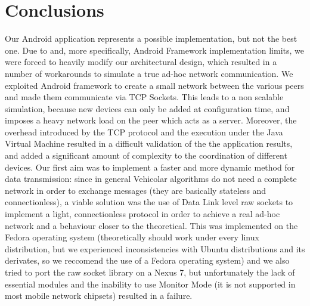 \newpage
\section{Conclusions}
	Our Android application represents a possible implementation, but not the best one. Due to \direct and, more specifically, Android \direct Framework implementation limits, we were forced to heavily modify our architectural design, which resulted in a number of workarounds to simulate a true ad-hoc network communication. We exploited Android \direct framework to create a small network between the various peers and made them communicate via TCP Sockets. This leads to a non scalable simulation, because new devices can only be added at configuration time, and imposes a heavy network load on the peer which acts as a server.
	Moreover, the overhead introduced by the TCP protocol and the execution under the Java Virtual Machine resulted in a difficult validation of the the application results, and added a significant amount of complexity to the coordination of different devices.
	Our first aim was to implement a faster and more dynamic method for data transmission: since in general Vehicolar algorithms do not need a complete network in order to exchange messages (they are basically stateless and connectionless), a viable solution was the use of Data Link level raw sockets to implement a light, connectionless protocol in order to achieve a real ad-hoc network and a behaviour closer to the theoretical. This was implemented on the Fedora operating system (theoretically should work under every linux distribution, but we experienced inconsistencies with Ubuntu distributions and its derivates, so we reccomend the use of a Fedora operating system) and we also tried to port the raw socket library on a Nexus 7, but unfortunately the lack of essential modules and the inability to use Monitor Mode (it is not supported in most mobile network chipsets) resulted in a failure.


